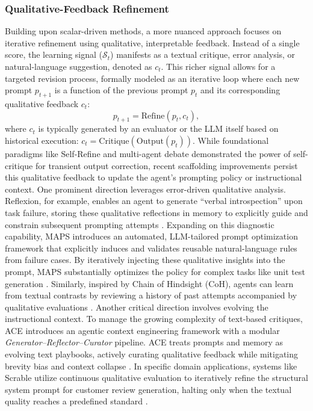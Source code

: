 \documentclass{article}
\begin{document}
\subsubsection{Qualitative-Feedback Refinement}
\label{sec:Qualitative_Feedback_Refinement}

Building upon scalar-driven methods, a more nuanced approach focuses on iterative refinement using qualitative, interpretable feedback. Instead of a single score, the learning signal ($\mathcal{S}_t$) manifests as a textual critique, error analysis, or natural-language suggestion, denoted as $c_t$. This richer signal allows for a targeted revision process, formally modeled as an iterative loop where each new prompt $p_{t+1}$ is a function of the previous prompt $p_t$ and its corresponding qualitative feedback $c_t$:
\begin{equation}p_{t+1} = \text{Refine}(p_t, c_t),
\end{equation}
where $c_t$ is typically generated by an evaluator or the LLM itself based on historical execution: $c_t = \text{Critique}(\text{Output}(p_t))$. While foundational paradigms like Self-Refine \citep{madaan2023self} and multi-agent debate \citep{liang2023debate} demonstrated the power of self-critique for transient output correction, recent scaffolding improvements persist this qualitative feedback to update the agent's prompting policy or instructional context. One prominent direction leverages error-driven qualitative analysis. Reflexion, for example, enables an agent to generate ``verbal introspection'' upon task failure, storing these qualitative reflections in memory to explicitly guide and constrain subsequent prompting attempts \citep{shinn2023reflexionlanguageagentsverbal}. Expanding on this diagnostic capability, MAPS introduces an automated, LLM-tailored prompt optimization framework that explicitly induces and validates reusable natural-language rules from failure cases. By iteratively injecting these qualitative insights into the prompt, MAPS substantially optimizes the policy for complex tasks like unit test generation \citep{gao2025promptalchemistautomatedllmtailored}. Similarly, inspired by Chain of Hindsight (CoH), agents can learn from textual contrasts by reviewing a history of past attempts accompanied by qualitative evaluations \citep{liu2023chain}. Another critical direction involves evolving the instructional context. To manage the growing complexity of text-based critiques, ACE introduces an agentic context engineering framework with a modular \textit{Generator–Reflector–Curator} pipeline. ACE treats prompts and memory as evolving text playbooks, actively curating qualitative feedback while mitigating brevity bias and context collapse \citep{zhang2025agenticcontextengineeringevolving}. In specific domain applications, systems like Scrable utilize continuous qualitative evaluation to iteratively refine the structural system prompt for customer review generation, halting only when the textual quality reaches a predefined standard \citep{azov2024selfimprovingcustomerreviewresponse}.
\end{document}
